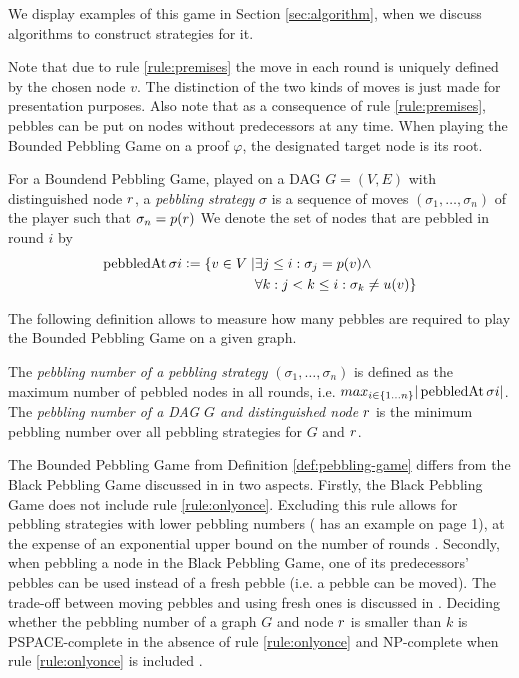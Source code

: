 We display examples of this game in Section \ref{sec:algorithm}, when we discuss algorithms to construct strategies for it.

Note that due to rule \ref{rule:premises} the move in each round is uniquely defined by the chosen node $v$.
The distinction of the two kinds of moves is just made for presentation purposes.
Also note that as a consequence of rule \ref{rule:premises}, pebbles can be put on nodes without predecessors at any time.
When playing the Bounded Pebbling Game on a proof $\varphi$, the designated target node is its root.

\begin{definition}[Strategy]
\label{def:strategy}
For a Boundend Pebbling Game, played on a DAG $G = (V,E)$ with distinguished node $r$, 
a \emph{pebbling strategy} $\sigma$ is a sequence of moves $(\sigma_1,\ldots,\sigma_n)$ of the player such that $\sigma_n = p(r)$
We denote the set of nodes that are pebbled in round $i$ by 
\begin{align*}
	\operatorname{pebbledAt}{\sigma}{i} \mathrel{\mathop:}= \{ v \in V \mid	& \exists j \leq i: \sigma_j = p(v) \wedge\\
																								&\forall k: j < k \leq i: \sigma_k \neq u(v)\}
\end{align*}
\end{definition}

The following definition allows to measure how many pebbles are required to play the Bounded Pebbling Game on a given graph.

\begin{definition}
The \emph{pebbling number of a pebbling strategy} $(\sigma_1,\ldots,\sigma_n)$ is defined as the maximum number of pebbled nodes in all rounds, 
i.e. $max_{i \scriptstyle \in \{1\ldots n\} \displaystyle}|\operatorname{pebbledAt}{\sigma}{i}|$.
The \emph{pebbling number of a DAG $G$ and distinguished node $r$} is the minimum pebbling number over all pebbling strategies for $G$ and $r$.
\end{definition}

The Bounded Pebbling Game from Definition \ref{def:pebbling-game} differs from the Black Pebbling Game discussed in \cite{Hertel2007,Pippenger1982} in two aspects. 
Firstly, the Black Pebbling Game does not include rule \ref{rule:onlyonce}. 
Excluding this rule allows for pebbling strategies with lower pebbling numbers (\cite{Sethi1975} has an example on page 1), at the expense of an exponential upper bound on the number of rounds \cite{EmdeBoas1979}.
Secondly, when pebbling a node in the Black Pebbling Game, one of its predecessors' pebbles can be used instead of a fresh pebble (i.e. a pebble can be moved). 
The trade-off between moving pebbles and using fresh ones is discussed in \cite{EmdeBoas1979}. 
Deciding whether the pebbling number of a graph $G$ and node $r$ is smaller than $k$ is PSPACE-complete in the absence of rule \ref{rule:onlyonce} \cite{Gilbert1980} and NP-complete when rule \ref{rule:onlyonce} is included \cite{Sethi1975}.

